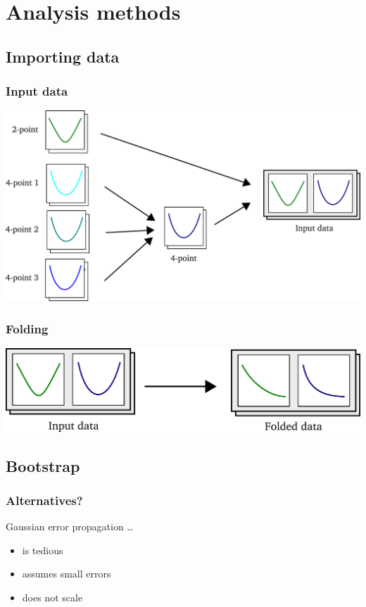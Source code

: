 \documentclass[english, fleqn]{beamer}
\begin{document}
\section{Analysis methods}

\newcommand\scale{0.2}

\subsection{Importing data}

\begin{frame}
    \frametitle{Input data}
    \begin{center}
        \includegraphics[scale=\scale]{sketches/01-input.pdf}
    \end{center}
\end{frame}

\begin{frame}
    \frametitle{Folding}
    \begin{center}
        \includegraphics[scale=\scale]{sketches/02-folding.pdf}
    \end{center}
\end{frame}

\subsection{Bootstrap}

\begin{frame}
    \frametitle{Alternatives?}
    Gaussian error propagation …
    \begin{itemize}
        \item
            is tedious
        \item
            assumes small errors
        \item
            does not scale
    \end{itemize}
\end{frame}
\end{document}

